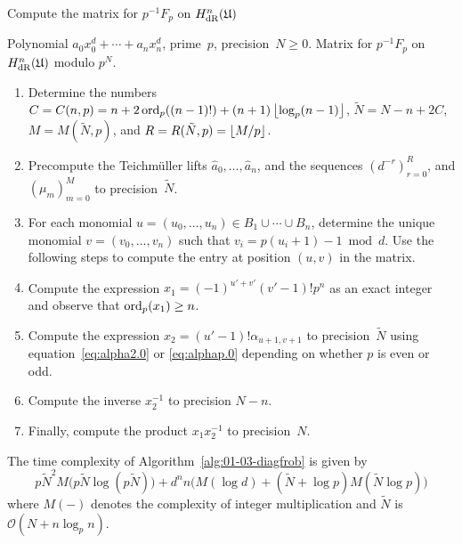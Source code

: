 \begin{algorithm}
\caption{Compute the matrix for $p^{-1} F_p$ on $H_{\text{dR}}^n(\mathfrak{U})$}
\label{alg:01-03-diagfrob}
\begin{algorithmic}
\vspace{1mm}
\Require Polynomial $a_0 x_0^d + \dotsb + a_n x_n^d$, 
         prime~$p$, precision~$N \geq 0$.
\Ensure  Matrix for $p^{-1} F_p$ on $H_{\text{dR}}^n(\mathfrak{U})$ modulo $p^N$.
\begin{enumerate}
\item Determine the numbers 
      $C = C(n,p) = n + 2 \operatorname{ord}_p((n-1)!) + (n+1) \left\lfloor\log_p(n-1)\right\rfloor$, 
      $\tilde{N} = N - n + 2 C$, $M = M(\tilde{N}, p)$, and 
      $R = R(\tilde{N}, p) = \left\lfloor M/p\right\rfloor$.
\item Precompute the Teichm\"uller lifts $\hat{a}_0, \dotsc, \hat{a}_n$, 
      and the sequences $(d^{-r})_{r=0}^R$, and $(\mu_m)_{m=0}^{M}$ 
      to precision~$\tilde{N}$.
\item For each monomial $u = (u_0, \dotsc, u_n) \in B_1 \cup \dotsb \cup B_n$, 
      determine the unique monomial $v = (v_0, \dotsc, v_n)$ such that 
      $v_i = p (u_i + 1) - 1 \bmod{d}$.  Use the following steps to 
      compute the entry at position $(u,v)$ in the matrix.
\item Compute the expression $x_1 = (-1)^{u'+v'} (v'-1)! p^n$ as an 
      exact integer and observe that \mbox{$\operatorname{ord}_p(x_1) \geq n$}.
\item Compute the expression $x_2 = (u' - 1)! \alpha_{u+1,v+1}$ to 
      precision~$\tilde{N}$ using equation~\eqref{eq:alpha2.0} or 
      \eqref{eq:alphap.0} depending on whether $p$ is even or odd. 
\item Compute the inverse $x_2^{-1}$ to precision $N - n$.
\item Finally, compute the product $x_1 x_2^{-1}$ to precision~$N$.
\end{enumerate}
\EndProcedure
\end{algorithmic}
\end{algorithm}

\begin{thm} \label{thm:dm-diagfrob-complexity1}
The time complexity of Algorithm~\ref{alg:01-03-diagfrob} is given 
by 
\begin{equation*}
p \tilde{N}^2 M\bigl(p \tilde{N} \log (p \tilde{N})\bigr)
    + d^n n \bigl( M(\log d) + (\tilde{N} + \log p) M(\tilde{N} \log p) \bigr)
\end{equation*}
where $M(-)$ denotes the complexity of integer multiplication and 
$\tilde{N}$ is $\mathcal{O}(N + n \log_p n)$.
\end{thm}

